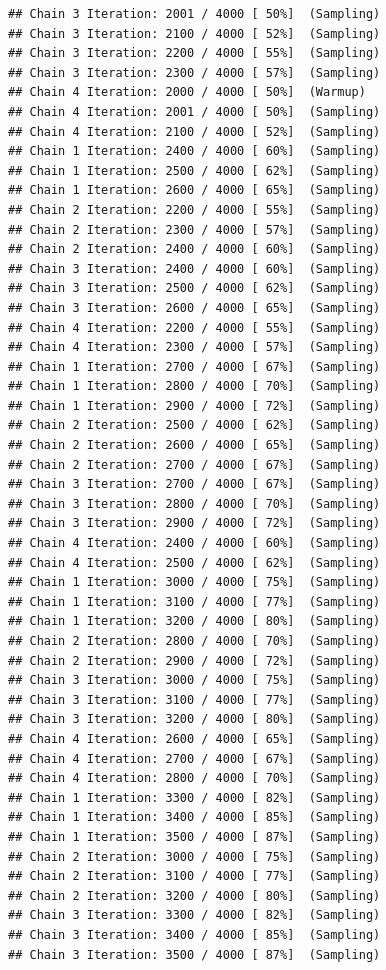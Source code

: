 \documentclass[
]{article}
\begin{document}
\begin{verbatim}
## Chain 3 Iteration: 2001 / 4000 [ 50%]  (Sampling) 
## Chain 3 Iteration: 2100 / 4000 [ 52%]  (Sampling) 
## Chain 3 Iteration: 2200 / 4000 [ 55%]  (Sampling) 
## Chain 3 Iteration: 2300 / 4000 [ 57%]  (Sampling) 
## Chain 4 Iteration: 2000 / 4000 [ 50%]  (Warmup) 
## Chain 4 Iteration: 2001 / 4000 [ 50%]  (Sampling) 
## Chain 4 Iteration: 2100 / 4000 [ 52%]  (Sampling) 
## Chain 1 Iteration: 2400 / 4000 [ 60%]  (Sampling) 
## Chain 1 Iteration: 2500 / 4000 [ 62%]  (Sampling) 
## Chain 1 Iteration: 2600 / 4000 [ 65%]  (Sampling) 
## Chain 2 Iteration: 2200 / 4000 [ 55%]  (Sampling) 
## Chain 2 Iteration: 2300 / 4000 [ 57%]  (Sampling) 
## Chain 2 Iteration: 2400 / 4000 [ 60%]  (Sampling) 
## Chain 3 Iteration: 2400 / 4000 [ 60%]  (Sampling) 
## Chain 3 Iteration: 2500 / 4000 [ 62%]  (Sampling) 
## Chain 3 Iteration: 2600 / 4000 [ 65%]  (Sampling) 
## Chain 4 Iteration: 2200 / 4000 [ 55%]  (Sampling) 
## Chain 4 Iteration: 2300 / 4000 [ 57%]  (Sampling) 
## Chain 1 Iteration: 2700 / 4000 [ 67%]  (Sampling) 
## Chain 1 Iteration: 2800 / 4000 [ 70%]  (Sampling) 
## Chain 1 Iteration: 2900 / 4000 [ 72%]  (Sampling) 
## Chain 2 Iteration: 2500 / 4000 [ 62%]  (Sampling) 
## Chain 2 Iteration: 2600 / 4000 [ 65%]  (Sampling) 
## Chain 2 Iteration: 2700 / 4000 [ 67%]  (Sampling) 
## Chain 3 Iteration: 2700 / 4000 [ 67%]  (Sampling) 
## Chain 3 Iteration: 2800 / 4000 [ 70%]  (Sampling) 
## Chain 3 Iteration: 2900 / 4000 [ 72%]  (Sampling) 
## Chain 4 Iteration: 2400 / 4000 [ 60%]  (Sampling) 
## Chain 4 Iteration: 2500 / 4000 [ 62%]  (Sampling) 
## Chain 1 Iteration: 3000 / 4000 [ 75%]  (Sampling) 
## Chain 1 Iteration: 3100 / 4000 [ 77%]  (Sampling) 
## Chain 1 Iteration: 3200 / 4000 [ 80%]  (Sampling) 
## Chain 2 Iteration: 2800 / 4000 [ 70%]  (Sampling) 
## Chain 2 Iteration: 2900 / 4000 [ 72%]  (Sampling) 
## Chain 3 Iteration: 3000 / 4000 [ 75%]  (Sampling) 
## Chain 3 Iteration: 3100 / 4000 [ 77%]  (Sampling) 
## Chain 3 Iteration: 3200 / 4000 [ 80%]  (Sampling) 
## Chain 4 Iteration: 2600 / 4000 [ 65%]  (Sampling) 
## Chain 4 Iteration: 2700 / 4000 [ 67%]  (Sampling) 
## Chain 4 Iteration: 2800 / 4000 [ 70%]  (Sampling) 
## Chain 1 Iteration: 3300 / 4000 [ 82%]  (Sampling) 
## Chain 1 Iteration: 3400 / 4000 [ 85%]  (Sampling) 
## Chain 1 Iteration: 3500 / 4000 [ 87%]  (Sampling) 
## Chain 2 Iteration: 3000 / 4000 [ 75%]  (Sampling) 
## Chain 2 Iteration: 3100 / 4000 [ 77%]  (Sampling) 
## Chain 2 Iteration: 3200 / 4000 [ 80%]  (Sampling) 
## Chain 3 Iteration: 3300 / 4000 [ 82%]  (Sampling) 
## Chain 3 Iteration: 3400 / 4000 [ 85%]  (Sampling) 
## Chain 3 Iteration: 3500 / 4000 [ 87%]  (Sampling) 

\end{verbatim}
\end{document}
